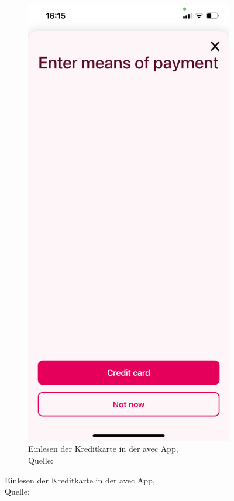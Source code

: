 \begin{figure}[h]
\begin{subfigure}[b]{0.4\textwidth}
		\label{img: Einlesen der Identitaetskarte}
	\end{subfigure}
	\hfill
	 \begin{subfigure}[b]{0.4\textwidth}
		\includegraphics[scale=0.15]{images/creditCard.PNG}
		\caption[Einlesen der Kreditkarte in der avec App]{Einlesen der Kreditkarte in der avec App,\\ Quelle: \cite{avecApp}}
		\label{img: Einlesen der Kreditkarte in der avec App}
	\end{subfigure}
\end{figure}

